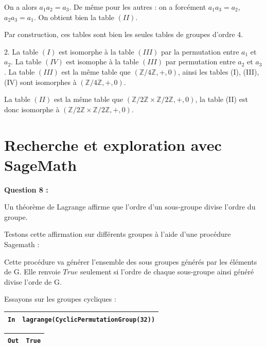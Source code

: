 \documentclass[titlepage]{article}
\begin{document}
    On a alors $a_1a_2 = a_3$. De même pour les autres : on a forcément $a_1a_3 = a_2$, $a_2a_3 = a_1$.
    On obtient bien la table $(II)$.\newline

    Par construction, ces tables sont bien les seules tables de groupes d'ordre 4.\newline

    2. La table $(I)$ est isomorphe à la table $(III)$ par la permutation entre $a_1$ et $a_2$. 
    La table $(IV)$ est isomophe à la table $(III)$ par permutation entre $a_2$ et $a_3$.
    La table $(III)$ est la même table que $(\mathbb{Z}/4\mathbb{Z}, +, 0)$, ainsi les tables (I), (III), (IV) sont isomorphes à $(\mathbb{Z}/4\mathbb{Z}, +, 0)$.\newline

    La table $(II)$ est la même table que $(\mathbb{Z}/2\mathbb{Z} \times \mathbb{Z}/2\mathbb{Z}, +, 0)$, la table (II) est donc isomorphe à $(\mathbb{Z}/2\mathbb{Z} \times \mathbb{Z}/2\mathbb{Z}, +, 0)$.
    \section{Recherche et exploration avec SageMath}
    \textbf{Question 8 :}

    Un théorème de Lagrange affirme que l’ordre d’un sous-groupe divise l’ordre du groupe.

    Testons cette affirmation sur différents groupes à l'aide d'une procédure Sagemath : 

    

    Cette procédure va générer l'ensemble des sous groupes générés par les éléments de G.
    Elle renvoie $True$ seulement si l'ordre de chaque sous-groupe ainsi généré divise l'orde de G.
    \newline

    Essayons sur les groupes cycliques :

    \begin{tabularx}{11.5cm}{|p{0.60cm}|X|}
        \hline
        \verb|In|
        & 
        \verb|lagrange(CyclicPermutationGroup(32))|
        \\
        \hline
    \end{tabularx}\newline
    \begin{tabularx}{11.5cm}{|p{0.60cm}|X|}
        \hline
        \verb|Out|
        & 
        \verb|True|
        \\
        \hline
    \end{tabularx}\newline
\end{document}
